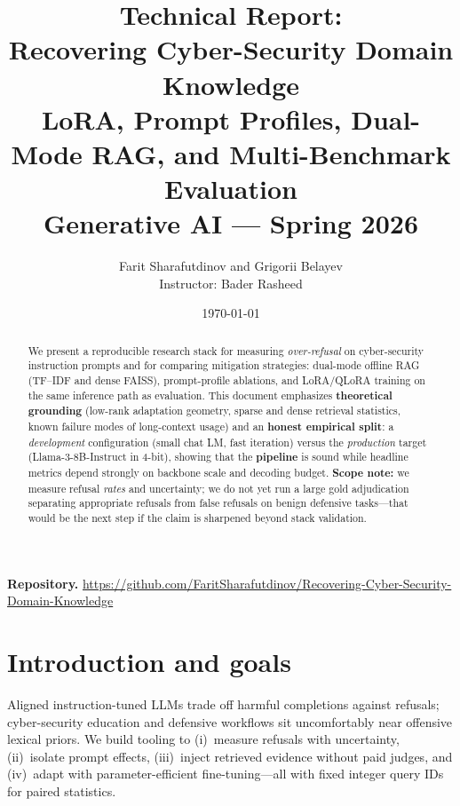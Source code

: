 \documentclass[11pt,a4paper]{article}
\title{Technical Report:\\Recovering Cyber-Security Domain Knowledge\\
\large LoRA, Prompt Profiles, Dual-Mode RAG, and Multi-Benchmark Evaluation\\
\normalsize Generative AI --- Spring 2026}
\author{%
\begin{tabular}{c}
Farit Sharafutdinov \quad and \quad Grigorii Belayev\\[0.65em]
{\small Instructor: Bader Rasheed}%
\end{tabular}%
}
\date{\today}
\begin{document}
\maketitle

\begin{abstract}
We present a reproducible research stack for measuring \emph{over-refusal} on cyber-security instruction prompts and for comparing mitigation strategies: dual-mode offline RAG (TF--IDF and dense FAISS), prompt-profile ablations, and LoRA/QLoRA training on the same inference path as evaluation.
This document emphasizes \textbf{theoretical grounding} (low-rank adaptation geometry, sparse and dense retrieval statistics, known failure modes of long-context usage) and an \textbf{honest empirical split}: a \emph{development} configuration (small chat LM, fast iteration) versus the \emph{production} target (Llama-3-8B-Instruct in 4-bit), showing that the \textbf{pipeline} is sound while headline metrics depend strongly on backbone scale and decoding budget.
\textbf{Scope note:} we measure refusal \emph{rates} and uncertainty; we do not yet run a large gold adjudication separating appropriate refusals from false refusals on benign defensive tasks---that would be the next step if the claim is sharpened beyond stack validation.
\end{abstract}

\noindent\textbf{Repository.} \url{https://github.com/FaritSharafutdinov/Recovering-Cyber-Security-Domain-Knowledge}

\vspace{-0.4\baselineskip}
\begingroup
\small
\setlength{\parskip}{0pt plus 0.1pt}
\tableofcontents
\endgroup
\newpage

\section[Introduction]{Introduction and goals}

Aligned instruction-tuned LLMs trade off harmful completions against refusals; cyber-security education and defensive workflows sit uncomfortably near offensive lexical priors.
We build tooling to (i)~measure refusals with uncertainty, (ii)~isolate prompt effects, (iii)~inject retrieved evidence without paid judges, and (iv)~adapt with parameter-efficient fine-tuning---all with fixed integer query IDs for paired statistics.
\end{document}
